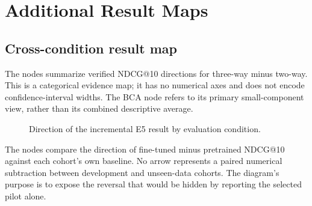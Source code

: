 \chapter{Additional Result Maps}


\section{Cross-condition result map}
The nodes summarize verified NDCG@10 directions for three-way minus two-way. This is a categorical evidence map; it has no numerical axes and does not encode confiden\allowbreak{}ce-inter\allowbreak{}val widths. The BCA node refers to its primary small-component view, rather than its combined descriptive average.

\begin{figure}[p]
\centering
{}
\caption[Direction of the incremental E5 result by evaluation condition.]{Direction of the incremental E5 result by evaluation condition.}
\label{fig:G.1}
\end{figure}
The nodes compare the direction of fine-tuned minus pretrained NDCG@10 against each cohort's own baseline. No arrow represents a paired numerical subtraction between development and unseen-data cohorts. The diagram's purpose is to expose the reversal that would be hidden by reporting the selected pilot alone.

